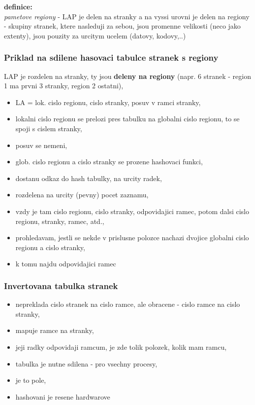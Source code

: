\documentclass[a4paper, 11pt]{article}
\begin{document}
\textbf{definice:} \\[0.5em]
\textit{pametove regiony} - LAP je delen na stranky a na vyssi urovni je delen na regiony - skupiny stranek, ktere nasleduji za sebou, jsou promenne velikosti (neco jako extenty), jsou pouzity za urcitym ucelem (datovy, kodovy,..) \\

\subsubsection{Priklad na sdilene hasovaci tabulce stranek s regiony}
LAP je rozdelen na stranky, ty jsou \textbf{deleny na regiony} (napr. 6 stranek - region 1 ma prvni 3 stranky, region 2 ostatni),
\begin{itemize}
    \item LA = lok. cislo regionu, cislo stranky, posuv v ramci stranky,
    \item lokalni cislo regionu se prelozi pres tabulku na globalni cislo regionu, to se spoji s cislem stranky,
    \item posuv se nemeni,
    \item glob. cislo regionu a cislo stranky se prozene hashovaci funkci,
    \item dostanu odkaz do hash tabulky, na urcity radek,
    \item rozdelena na urcity (pevny) pocet zaznamu, 
    \item vzdy je tam cislo regionu, cislo stranky, odpovidajici ramec, potom dalsi cislo regionu, stranky, ramec, atd.,
    \item prohledavam, jestli se nekde v prislusne polozce nachazi dvojice globalni cislo regionu a cislo stranky,
    \item k tomu najdu odpovidajici ramec \\
\end{itemize}

\subsubsection{Invertovana tabulka stranek}
\begin{itemize}
    \item nepreklada cislo stranek na cislo ramce, ale obracene - cislo ramce na cislo stranky,
    \item mapuje ramce na stranky,
    \item jeji radky odpovidaji ramcum, je zde tolik polozek, kolik mam ramcu,
    \item tabulka je nutne sdilena - pro vsechny procesy,
    \item je to pole,
    \item hashovani je resene hardwarove \\
\end{itemize}
\end{document}
